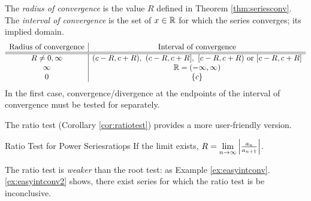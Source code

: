 \begin{defn}{}{}
	The \emph{radius of convergence} is the value $R$ defined in Theorem \ref{thm:seriesconv}. The \emph{interval of convergence} is the set of $x\in\mathbb{R}$ for which the series converges; its implied domain.
	\[
		\begin{array}{c|c}
			\text{Radius of convergence}&\text{Interval of convergence}\\\hline\hline
			R\neq 0,\infty&(c-R,c+R),\ (c-R,c+R],\ [c-R,c+R)\ \text{or }[c-R,c+R]\\
			\infty&\R=(-\infty,\infty)\\
			0&\{c\}
		\end{array}
	\]
	In the first case, convergence/divergence at the endpoints of the interval of convergence must be tested for separately.
\end{defn}

The ratio test (Corollary \ref{cor:ratiotest}) provides a more user-friendly version.

\begin{cor}{Ratio Test for Power Series}{ratiops}
	If the limit exists, $R=\lim\limits_{n\to\infty}\left| \frac{a_n}{a_{n+1}}\right|$.
\end{cor}

The ratio test is \emph{weaker} than the root test: as Example \ref*{ex:easyintconv}.\ref{ex:easyintconv2} shows, there exist series for which the ratio test is be inconclusive.

\goodbreak


